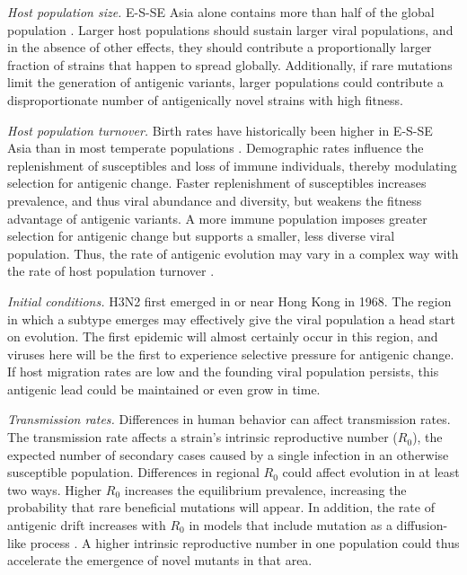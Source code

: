 \documentclass[10pt]{article}
\begin{document}
\textit{Host population size.}
E-S-SE Asia alone contains more than half of the global population \cite{UN:2013}. 
Larger host populations should sustain larger viral populations, and in the absence of other effects, they should contribute a proportionally larger fraction of strains that happen to spread globally.
Additionally, if rare mutations limit the generation of antigenic variants, larger populations could contribute a disproportionate number of antigenically novel strains with high fitness.

\textit{Host population turnover.} 
Birth rates have historically been higher in E-S-SE Asia than in most temperate populations \cite{UN:2013}. 
Demographic rates influence the replenishment of susceptibles and loss of immune individuals, thereby modulating selection for antigenic change. 
Faster replenishment of susceptibles increases prevalence, and thus viral abundance and diversity, but weakens the fitness advantage of antigenic variants.
A more immune population imposes greater selection for antigenic change but supports a smaller, less diverse viral population.  
Thus, the rate of antigenic evolution may vary in a complex way with the rate of host population turnover \cite{Grenfell:2004ho}. 

\textit{Initial conditions.}
H3N2 first emerged in or near Hong Kong in 1968.
The region in which a subtype emerges may effectively give the viral population a head start on evolution. 
The first epidemic will almost certainly occur in this region, and viruses here will be the first to experience selective pressure for antigenic change. 
If host migration rates are low and the founding viral population persists, this antigenic lead could be maintained or even grow in time. 

\textit{Transmission rates.}
Differences in human behavior can affect transmission rates.
The transmission rate affects a strain's intrinsic reproductive number ($R_0$), the expected number of secondary cases caused by a single infection in an otherwise susceptible population.
Differences in regional $R_0$ could affect evolution in at least two ways.
Higher $R_0$ increases the equilibrium prevalence, increasing the probability that rare beneficial mutations will appear. 
In addition, the rate of antigenic drift increases with $R_0$ in models that include mutation as a diffusion-like process \cite{Lin:2003ht,Gog:2002bi, Kucharski:2012ez, Bedford:2015fj}. 
A higher intrinsic reproductive number in one population could thus accelerate the emergence of novel mutants in that area. 
\end{document}
